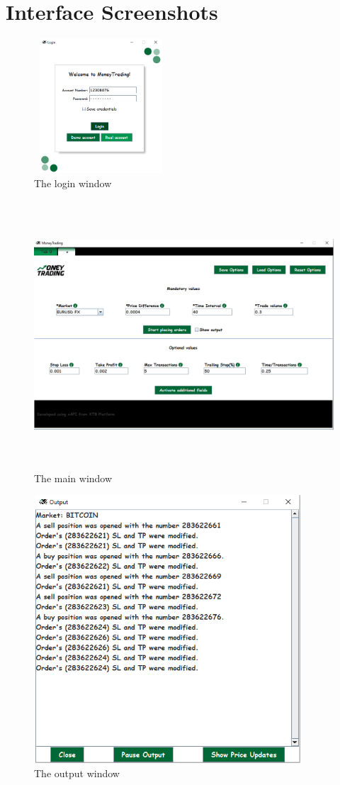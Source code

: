 \documentclass[12pt,a4paper]{report}
\begin{document}
\section{Interface Screenshots}
\begin{figure}[!ht]
	\centering
	\includegraphics[width=5cm,height=5cm]{pics/login.png}
	\caption{The login window}
	\label{fig:login}
\end{figure}
\begin{figure}[!ht]
	\centering
	\includegraphics[width=16cm,height=10cm]{pics/mainwindow.png}
	\caption{The main window}
	\label{fig:mainwindow}
\end{figure}
\begin{figure}[!ht]
	\centering
	\includegraphics[width=10cm,height=10cm]{pics/output.png}
	\caption{The output window}
	\label{fig:output}
\end{figure}
\end{document}
